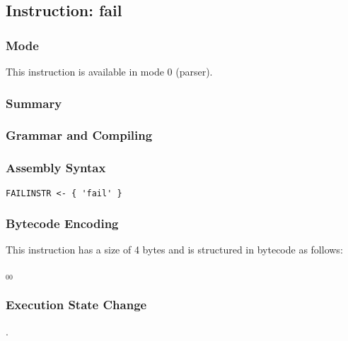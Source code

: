 \subsection{Instruction: fail}

\subsubsection{Mode}
This instruction is available in mode 0 (parser).
\subsubsection{Summary}


\subsubsection{Grammar and Compiling}


\subsubsection{Assembly Syntax}

\begin{myquote}
\begin{verbatim}
FAILINSTR <- { 'fail' }
\end{verbatim}
\end{myquote}

\subsubsection{Bytecode Encoding}

This instruction has a size of 4 bytes and is structured in bytecode as follows:

$_{00}$\ 


\subsubsection{Execution State Change}

.


